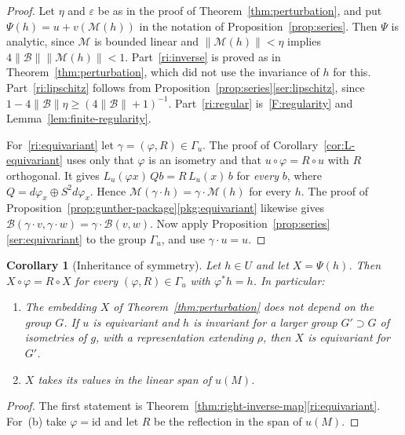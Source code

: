 \documentclass[11pt]{amsart}
\newtheorem{corollary}[theorem]{Corollary}
\theoremstyle{definition}
\newcommand{\cM}{\mathcal{M}}
\newcommand{\cB}{\mathcal{B}}
\begin{document}
\begin{proof}
Let $\eta$ and $\varepsilon$ be as in the proof of Theorem~\ref{thm:perturbation}, and put
$\Psi(h)=u+v(\cM(h))$ in the notation of Proposition~\ref{prop:series}. Then $\Psi$ is analytic,
since $\cM$ is bounded linear and $\|\cM(h)\|<\eta$ implies $4\|\cB\|\|\cM(h)\|<1$.
Part~\ref{ri:inverse} is proved as in Theorem~\ref{thm:perturbation}, which did not use the
invariance of $h$ for this. Part~\ref{ri:lipschitz} follows from
Proposition~\ref{prop:series}\ref{ser:lipschitz}, since
$1-4\|\cB\|\eta\ge(4\|\cB\|+1)^{-1}$. Part~\ref{ri:regular} is~\ref{F:regularity} and
Lemma~\ref{lem:finite-regularity}.

For~\ref{ri:equivariant} let $\gamma=(\varphi,R)\in\Gamma_u$. The proof of
Corollary~\ref{cor:L-equivariant} uses only that $\varphi$ is an isometry and that
$u\circ\varphi=R\circ u$ with $R$ orthogonal. It gives
$L_u(\varphi x)\,Qb=R\,L_u(x)\,b$ for \emph{every} $b$, where
$Q=d\varphi_x\oplus S^2d\varphi_x$. Hence $\cM(\gamma\cdot h)=\gamma\cdot\cM(h)$ for every $h$.
The proof of Proposition~\ref{prop:gunther-package}\ref{pkg:equivariant} likewise gives
$\cB(\gamma\cdot v,\gamma\cdot w)=\gamma\cdot\cB(v,w)$. Now apply
Proposition~\ref{prop:series}\ref{ser:equivariant} to the group $\Gamma_u$, and use
$\gamma\cdot u=u$.
\end{proof}

\begin{corollary}[Inheritance of symmetry]\label{cor:inherit}
Let $h\in U$ and let $X=\Psi(h)$. Then $X\circ\varphi=R\circ X$ for every
$(\varphi,R)\in\Gamma_u$ with $\varphi^*h=h$. In particular:
\begin{enumerate}[label=(\alph*)]
\item The embedding $X$ of Theorem~\ref{thm:perturbation} does not depend on the group $G$. If
$u$ is equivariant and $h$ is invariant for a larger group $G'\supset G$ of isometries of $g$,
with a representation extending $\rho$, then $X$ is equivariant for $G'$.
\item $X$ takes its values in the linear span of $u(M)$.
\end{enumerate}
\end{corollary}

\begin{proof}
The first statement is Theorem~\ref{thm:right-inverse-map}\ref{ri:equivariant}. For~(b) take
$\varphi=\mathrm{id}$ and let $R$ be the reflection in the span of $u(M)$.
\end{proof}
\end{document}
